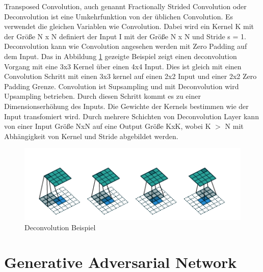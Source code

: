 \documentclass{llncs}
\begin{document}
Transposed Convolution, auch genannt Fractionally Strided Convolution oder Deconvolution ist eine Umkehrfunktion von der üblichen Convolution. Es verwendet die gleichen Variablen wie Convolution. Dabei wird ein Kernel K mit der Größe N x N definiert der Input I mit der Größe N x N und Stride s = 1. Deconvolution kann wie Convolution angesehen werden mit  Zero Padding auf dem Input.  Das in Abbildung \ref{fig:Bild4} gezeigte Beispiel zeigt einen deconvolution Vorgang mit eine 3x3 Kernel über einen 4x4 Input. Dies ist gleich mit einen Convolution Schritt mit einen 3x3 kernel auf einen 2x2 Input und einer 2x2 Zero Padding Grenze. Convolution ist Supsampling und mit Deconvolution wird Upsampling betrieben. Durch diesen Schritt kommt es zu einer Dimensionserhöhung des Inputs. Die Gewichte der Kernels bestimmen wie der Input transfomiert wird. Durch mehrere Schichten von Deconvolution Layer kann von einer Input Größe NxN auf eine Output Größe KxK, wobei K $>$ N mit Abhängigkeit von Kernel und Stride abgebildet werden\cite{conv}. 

\begin{figure}[htbp] 
	\centering
	\includegraphics[width=1.0\textwidth]{decon.png}
	\caption{Deconvolution Beispiel}
	\label{fig:Bild4}
\end{figure}
\newpage
\section{Generative Adversarial Network}
\end{document}
